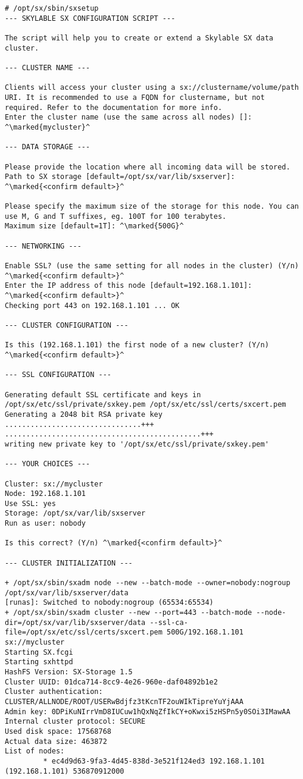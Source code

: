 \small
\begin{lstlisting}
# /opt/sx/sbin/sxsetup
--- SKYLABLE SX CONFIGURATION SCRIPT ---

The script will help you to create or extend a Skylable SX data
cluster.

--- CLUSTER NAME ---

Clients will access your cluster using a sx://clustername/volume/path
URI. It is recommended to use a FQDN for clustername, but not
required. Refer to the documentation for more info.
Enter the cluster name (use the same across all nodes) []: ^\marked{mycluster}^

--- DATA STORAGE ---

Please provide the location where all incoming data will be stored.
Path to SX storage [default=/opt/sx/var/lib/sxserver]: ^\marked{<confirm default>}^

Please specify the maximum size of the storage for this node. You can
use M, G and T suffixes, eg. 100T for 100 terabytes.
Maximum size [default=1T]: ^\marked{500G}^

--- NETWORKING ---

Enable SSL? (use the same setting for all nodes in the cluster) (Y/n)
^\marked{<confirm default>}^
Enter the IP address of this node [default=192.168.1.101]: ^\marked{<confirm default>}^
Checking port 443 on 192.168.1.101 ... OK

--- CLUSTER CONFIGURATION ---

Is this (192.168.1.101) the first node of a new cluster? (Y/n)
^\marked{<confirm default>}^

--- SSL CONFIGURATION ---

Generating default SSL certificate and keys in
/opt/sx/etc/ssl/private/sxkey.pem /opt/sx/etc/ssl/certs/sxcert.pem
Generating a 2048 bit RSA private key
................................+++
..............................................+++
writing new private key to '/opt/sx/etc/ssl/private/sxkey.pem'

--- YOUR CHOICES ---

Cluster: sx://mycluster
Node: 192.168.1.101
Use SSL: yes
Storage: /opt/sx/var/lib/sxserver
Run as user: nobody

Is this correct? (Y/n) ^\marked{<confirm default>}^

--- CLUSTER INITIALIZATION ---

+ /opt/sx/sbin/sxadm node --new --batch-mode --owner=nobody:nogroup /opt/sx/var/lib/sxserver/data
[runas]: Switched to nobody:nogroup (65534:65534)
+ /opt/sx/sbin/sxadm cluster --new --port=443 --batch-mode --node-dir=/opt/sx/var/lib/sxserver/data --ssl-ca-file=/opt/sx/etc/ssl/certs/sxcert.pem 500G/192.168.1.101 sx://mycluster
Starting SX.fcgi
Starting sxhttpd
HashFS Version: SX-Storage 1.5
Cluster UUID: 01dca714-8cc9-4e26-960e-daf04892b1e2
Cluster authentication: CLUSTER/ALLNODE/ROOT/USERwBdjfz3tKcnTF2ouWIkTipreYuYjAAA
Admin key: 0DPiKuNIrrVmD8IUCuw1hQxNqZfIkCY+oKwxi5zHSPn5y0SOi3IMawAA
Internal cluster protocol: SECURE
Used disk space: 17568768
Actual data size: 463872
List of nodes:
         * ec4d9d63-9fa3-4d45-838d-3e521f124ed3 192.168.1.101 (192.168.1.101) 536870912000


\end{lstlisting}
